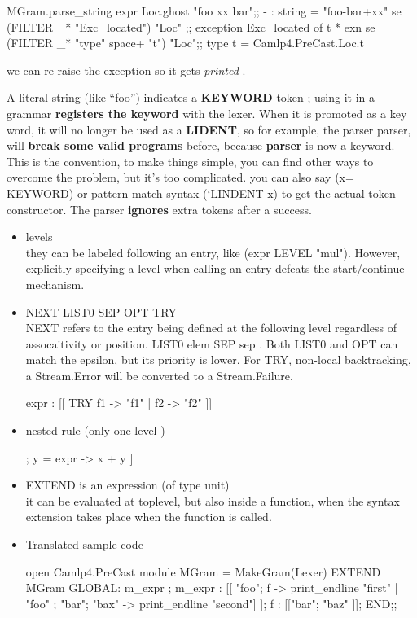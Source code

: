 \begin{enumerate}
\begin{enumerate}[(a)]
\begin{alternate}
MGram.parse_string expr Loc.ghost "foo xx bar";;
- : string = "foo-bar+xx"
se (FILTER _* "Exc_located") "Loc" ;;
exception Exc_located of t * exn
se (FILTER _* "type" space+ "t") "Loc";; 
type t = Camlp4.PreCast.Loc.t
\end{alternate}

we can re-raise the exception so it gets \textit{printed} .

A literal string (like ``foo'') indicates a \textbf{KEYWORD} token ;
using it in a grammar \textbf{registers the keyword} with the lexer. When
it is promoted as a key word, it will no longer be used as a \textbf{
  LIDENT}, so for example, the parser parser, will \textbf{break some valid
programs} before, because \textbf{parser} is now a keyword. This is the
convention, to make things simple, you can find other ways to overcome
the problem, but it's too complicated. you can also say (x= KEYWORD)
or pattern match syntax (`LINDENT x) to get the actual token
constructor. The parser \textbf{ignores} extra tokens after a success.

\begin{itemize}

\item levels \\
  they can be labeled following an entry, like (expr LEVEL "mul"). However,
  explicitly specifying a level when calling an entry defeats the
  start/continue mechanism.
\item NEXT LIST0 SEP OPT TRY \\
  NEXT refers to the entry being defined at the following level
  regardless of assocaitivity or position.
  LIST0 elem SEP sep .
  Both LIST0 and OPT can match the epsilon, but its priority is lower.
  For TRY, non-local backtracking, a Stream.Error will be converted to
  a Stream.Failure.
  \begin{bluecode}
    expr : [[ TRY f1 -> "f1" | f2 -> "f2" ]]
  \end{bluecode}
  
\item nested rule (only one level )

  \begin{bluecode}
    [x = expr ; ["+" | "plus" ]; y = expr -> x + y ]
  \end{bluecode}
\item EXTEND is an expression (of type unit) \\
  it can be evaluated at toplevel, but also inside a function, when
  the syntax extension takes place when the function is called.
\item Translated sample code   
  \begin{bluecode}
open Camlp4.PreCast  
module MGram = MakeGram(Lexer) 
EXTEND MGram 
   GLOBAL: m_expr ;
    m_expr : 
     [[ "foo"; f  -> print_endline "first"
      | "foo" ; "bar"; "bax" -> print_endline "second"]
     ]; 
    f : [["bar"; "baz" ]];  END;;
  \end{bluecode}


\end{itemize}
\end{enumerate}
\end{enumerate}
